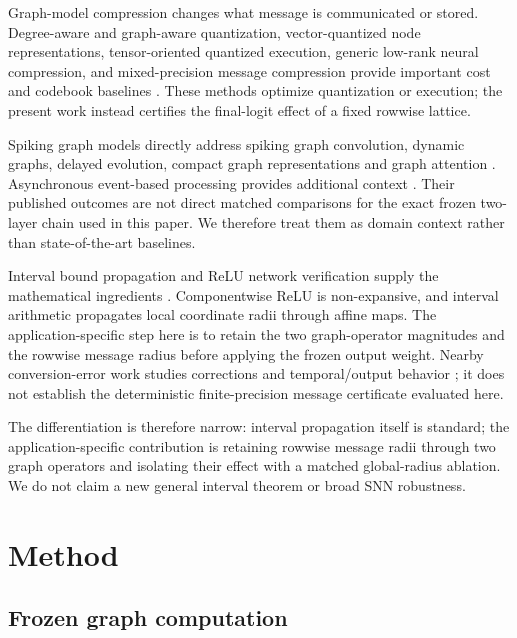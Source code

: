 \documentclass{article}
\begin{document}
Graph-model compression changes what message is communicated or stored. Degree-aware and graph-aware quantization, vector-quantized node representations, tensor-oriented quantized execution, generic low-rank neural compression, and mixed-precision message compression provide important cost and codebook baselines \cite{tailor2021degreequant,ding2021vqgnn,wang2022qgtc,zhu2023a2q,wan2023adaqp,cherukuri2025lowrank,gholami2022quantization,jacob2018quantization,nagel2021white}. These methods optimize quantization or execution; the present work instead certifies the final-logit effect of a fixed rowwise lattice.

Spiking graph models directly address spiking graph convolution, dynamic graphs, delayed evolution, compact graph representations and graph attention \cite{spikinggcn,spikenet,dy-sign,delay-dsgn,signnn,msg,li2023graph1bit,chaurasia2026sgspose,sun2024spikegraphormer,zhang2025sgnnbench}. Asynchronous event-based processing provides additional context \cite{asgcn}. Their published outcomes are not direct matched comparisons for the exact frozen two-layer chain used in this paper. We therefore treat them as domain context rather than state-of-the-art baselines.

Interval bound propagation and ReLU network verification supply the mathematical ingredients \cite{gowal2018ibp,wong2018provable,mirman2018diffai,katz2017reluplex}. Componentwise ReLU is non-expansive, and interval arithmetic propagates local coordinate radii through affine maps. The application-specific step here is to retain the two graph-operator magnitudes and the rowwise message radius before applying the frozen output weight. Nearby conversion-error work studies corrections and temporal/output behavior \cite{li2024erroraware,huang2025ecmt}; it does not establish the deterministic finite-precision message certificate evaluated here.

The differentiation is therefore narrow: interval propagation itself is standard; the application-specific contribution is retaining rowwise message radii through two graph operators and isolating their effect with a matched global-radius ablation. We do not claim a new general interval theorem or broad SNN robustness.

\section{Method}


\subsection{Frozen graph computation}
\end{document}
